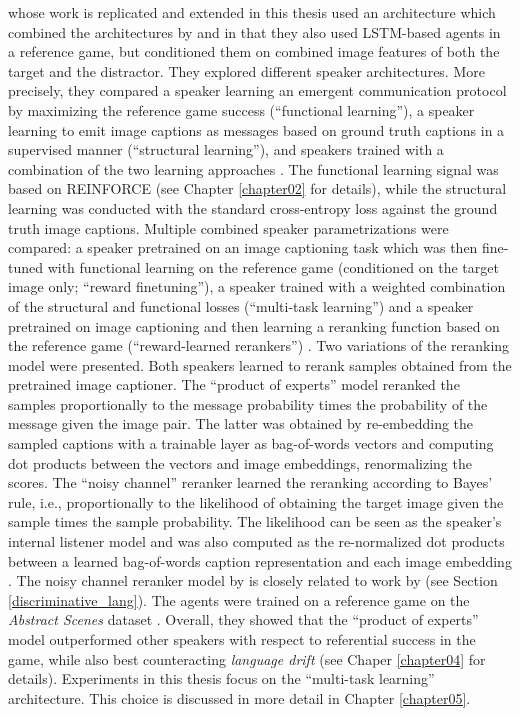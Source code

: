 \cite{lazaridou2020multi} whose work is replicated and extended in this thesis used an architecture which combined the architectures by \cite{lazaridou2016multi} and \cite{havrylov2017emergence} in that they also used LSTM-based agents in a reference game, but conditioned them on combined image features of both the target and the distractor. They explored different speaker architectures. More precisely, they compared a speaker learning an emergent communication protocol by maximizing the reference game success (``functional learning''), a speaker learning to emit image captions as messages based on ground truth captions in a supervised manner (``structural learning''), and speakers trained with a combination of the two learning approaches \parencite[][p.~4]{lazaridou2020multi}. The functional learning signal was based on REINFORCE (see Chapter \ref{chapter02} for details), while the structural learning was conducted with the standard cross-entropy loss against the ground truth image captions. Multiple combined speaker parametrizations were compared: a speaker pretrained on an image captioning task which was then fine-tuned with functional learning on the reference game (conditioned on the target image only; ``reward finetuning''), a speaker trained with a weighted combination of the structural and functional losses (``multi-task learning'') and a speaker pretrained on image captioning and then learning a reranking function based on the reference game (``reward-learned rerankers'') \parencite[][p.~4--5]{lazaridou2020multi}. Two variations of the reranking model were presented. Both speakers learned to rerank samples obtained from the pretrained image captioner. The ``product of experts'' model reranked the samples proportionally to the message probability times the probability of the message given the image pair. The latter was obtained by re-embedding the sampled captions with a trainable layer as bag-of-words vectors and computing dot products between the vectors and image embeddings, renormalizing the scores.  The ``noisy channel'' reranker learned the reranking according to Bayes' rule, i.e., proportionally to the likelihood of obtaining the target image given the sample times the sample probability. The likelihood can be seen as the speaker's internal listener model and was also computed as the re-normalized dot products between a learned bag-of-words caption representation and each image embedding \parencite[][p.~5--6]{lazaridou2020multi}. The noisy channel reranker model by \cite{lazaridou2020multi} is closely related to work by \cite{andreas2016reasoning} (see Section \ref{discriminative_lang}).
The agents were trained on a reference game on the \textit{Abstract Scenes} dataset \parencite{zitnick2013bringing}.
Overall, they showed that the ``product of experts'' model outperformed other speakers with respect to referential success in the game, while also best counteracting \textit{language drift} (see Chaper \ref{chapter04} for details). 
Experiments in this thesis focus on the ``multi-task learning'' architecture. This choice is discussed in more detail in Chapter \ref{chapter05}.

